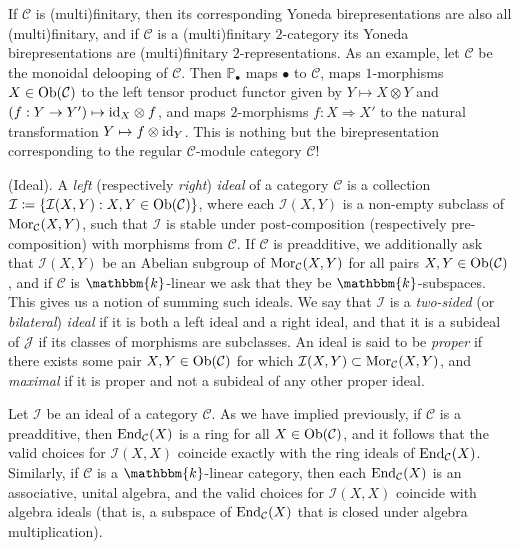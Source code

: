\noindent If $\mathscr{C}$ is (multi)finitary, then its corresponding Yoneda birepresentations are also all (multi)finitary, and if $\mathscr{C}$ is a (multi)finitary $2$-category its Yoneda birepresentations are (multi)finitary $2$-representations. As an example, let $\mathscr{C}$ be the monoidal delooping of $\mathcal{C}$. Then $\mathbb{P}_\bullet$ maps $\bullet$ to $\mathcal{C}$, maps $1$-morphisms $X \in \textnormal{Ob}(\mathcal{C})$ to the left tensor product functor given by $Y \mapsto X \otimes Y$ and $(f : Y \to Y') \mapsto \textup{id}_X \otimes f$, and maps $2$-morphisms $f : X \Rightarrow X'$ to the natural transformation $Y \mapsto f \otimes \textup{id}_Y$. This is nothing but the birepresentation corresponding to the regular $\mathcal{C}$-module category $\mathcal{C}$! %
\newpage

\noindent\begin{definition}\textup{(Ideal).} A {\em left} (respectively {\em right}) {\em ideal} of a category $\mathcal{C}$ is a collection\linebreak $\mathcal{I} \coloneqq \{\mathcal{I}(X, Y) : X, Y \in \textnormal{Ob}(\mathcal{C})\}$, where each $\mathcal{I}(X, Y)$ is a non-empty subclass of $\textnormal{Mor}_\mathcal{C}(X, Y)$, such that $\mathcal{I}$ is stable under post-composition (respectively pre-composition) with morphisms from $\mathcal{C}$. If $\mathcal{C}$ is preadditive, we additionally ask that $\mathcal{I}(X, Y)$ be an Abelian subgroup of $\textnormal{Mor}_\mathcal{C}(X, Y)$ for all pairs $X, Y \in \textnormal{Ob}(\mathcal{C})$, and if $\mathcal{C}$ is $\mathbbm{k}$-linear we ask that they be $\mathbbm{k}$-subspaces. This gives us a notion of summing such ideals. We say that $\mathcal{I}$ is a {\em two-sided} (or {\em bilateral}) {\em ideal} if it is both a left ideal and a right ideal, and that it is a subideal of $\mathcal{J}$ if its classes of morphisms are subclasses. An ideal is said to be {\em proper} if there exists some pair $X, Y \in \textnormal{Ob}(\mathcal{C})$ for which $\mathcal{I}(X, Y) \subset \textnormal{Mor}_\mathcal{C}(X, Y)$, and {\em maximal} if it is proper and not a subideal of any other proper ideal.\\
\end{definition}

\noindent Let $\mathcal{I}$ be an ideal of a category $\mathcal{C}$. As we have implied previously, if $\mathcal{C}$ is a preadditive, then $\textup{End}_\mathcal{C}(X)$ is a ring for all $X \in \textnormal{Ob}(\mathcal{C})$, and it follows that the valid choices for $\mathcal{I}(X, X)$ coincide exactly with the ring ideals of $\textup{End}_\mathcal{C}(X)$. Similarly, if $\mathcal{C}$ is a $\mathbbm{k}$-linear category, then each $\textup{End}_\mathcal{C}(X)$ is an associative, unital algebra, and the valid choices for $\mathcal{I}(X, X)$ coincide with algebra ideals (that is, a subspace of $\textup{End}_\mathcal{C}(X)$ that is closed under algebra multiplication).\\

